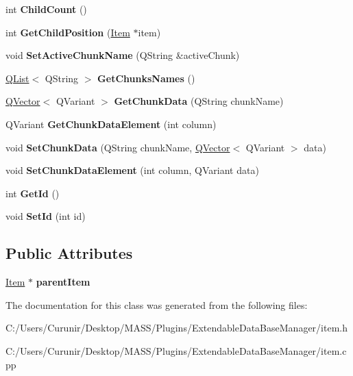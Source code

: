 \begin{DoxyCompactItemize}
int {\bfseries Child\+Count} ()
\item 
\mbox{\label{class_item_afccf539d108a9b083b67105ccb548f11}} 
int {\bfseries Get\+Child\+Position} (\hyperlink{class_item}{Item} $\ast$item)
\item 
\mbox{\label{class_item_accef83c1103296fc80b30a809e7ae293}} 
void {\bfseries Set\+Active\+Chunk\+Name} (Q\+String \&active\+Chunk)
\item 
\mbox{\label{class_item_a68ce6aeeb3977fda454f680811de37a4}} 
\hyperlink{class_q_list}{Q\+List}$<$ Q\+String $>$ {\bfseries Get\+Chunks\+Names} ()
\item 
\mbox{\label{class_item_adbc518bc597ca7a811dc4ec9dad3e51b}} 
\hyperlink{class_q_vector}{Q\+Vector}$<$ Q\+Variant $>$ {\bfseries Get\+Chunk\+Data} (Q\+String chunk\+Name)
\item 
\mbox{\label{class_item_a6f25765ce2c56248e04d04ebec90d34d}} 
Q\+Variant {\bfseries Get\+Chunk\+Data\+Element} (int column)
\item 
\mbox{\label{class_item_a0617312073b3d751518cfd6269c25c0a}} 
void {\bfseries Set\+Chunk\+Data} (Q\+String chunk\+Name, \hyperlink{class_q_vector}{Q\+Vector}$<$ Q\+Variant $>$ data)
\item 
\mbox{\label{class_item_a2206a4c379b351c9cbbe2406399d2b30}} 
void {\bfseries Set\+Chunk\+Data\+Element} (int column, Q\+Variant data)
\item 
\mbox{\label{class_item_a3466b4b51b244ccbcac853ee7240af47}} 
int {\bfseries Get\+Id} ()
\item 
\mbox{\label{class_item_a46a50959228845fc8d4c1a1e3cdfc9a3}} 
void {\bfseries Set\+Id} (int id)
\end{DoxyCompactItemize}
\subsection*{Public Attributes}
\begin{DoxyCompactItemize}
\item 
\mbox{\label{class_item_ac5078a594ac17181e0ee2d90c63e9aa1}} 
\hyperlink{class_item}{Item} $\ast$ {\bfseries parent\+Item}
\end{DoxyCompactItemize}


The documentation for this class was generated from the following files\+:\begin{DoxyCompactItemize}
\item 
C\+:/\+Users/\+Curunir/\+Desktop/\+M\+A\+S\+S/\+Plugins/\+Extendable\+Data\+Base\+Manager/item.\+h\item 
C\+:/\+Users/\+Curunir/\+Desktop/\+M\+A\+S\+S/\+Plugins/\+Extendable\+Data\+Base\+Manager/item.\+cpp\end{DoxyCompactItemize}
